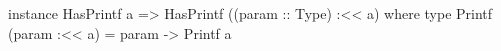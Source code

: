 \begin{code}
instance HasPrintf a
    => HasPrintf ((param :: Type) :<< a) where
  type Printf (param :<< a) = param -> Printf a
\end{code}
